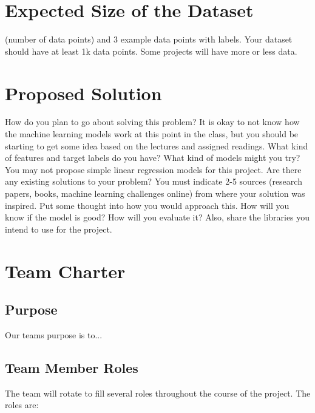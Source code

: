 \documentclass{article}
\begin{document}
\section{Expected Size of the Dataset}
(number of data points) and 3 example data points with labels. Your dataset should have at least 1k data points. Some projects will have more or less data. \\

\section{Proposed Solution}
How do you plan to go about solving this problem? It is okay to not know
how the machine learning models work at this point in the class, but you should be starting to get some idea based on the lectures and assigned readings. What kind of features and target labels do you have? What kind of models might you try? You may not propose simple linear regression models for this project. Are there any existing solutions to your problem?
You must indicate 2-5 sources (research papers, books, machine learning challenges online) from where your solution was inspired. Put some thought into how you would approach this. How will you know if the model is good? How will you evaluate it? Also, share the libraries you intend to use for the project. \\

\newpage
\section{Team Charter}
\subsection{Purpose}

Our teams purpose is to...\\

\subsection{Team Member Roles}

The team will rotate to fill several roles throughout the course of the project. The roles are: 
\end{document}

